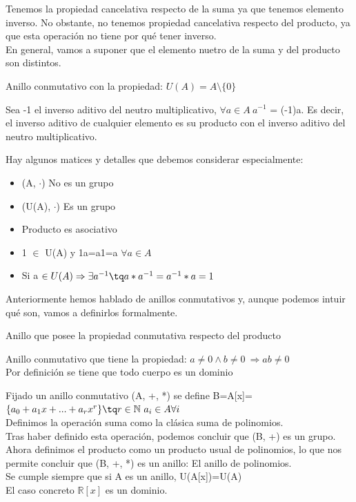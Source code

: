 \documentclass[nochap]{apuntes}
\begin{document}
Tenemos la propiedad cancelativa respecto de la suma ya que tenemos elemento inverso. No obstante, no tenemos propiedad cancelativa respecto del producto, 
ya que esta operación no tiene por qué tener inverso.\\
En general, vamos a suponer que el elemento nuetro de la suma y del producto son distintos.

\begin{defn}[Cuerpo]
 Anillo conmutativo con la propiedad: $U(A)=A \setminus \{0\}$
\end{defn}
\obs Sea -1 el inverso aditivo del neutro multiplicativo, $\forall a \in A \ a^{-1}$ = (-1)a. Es decir, el inverso aditivo de cualquier 
elemento es su producto con el inverso aditivo del neutro multiplicativo.

Hay algunos matices y detalles que debemos considerar especialmente:
\begin{itemize}
 \item (A, $\cdot$) No es un grupo
 \item (U(A), $\cdot$)  Es un grupo
 \item Producto es asociativo
 \item 1 $\in$ U(A) y 1a=a1=a $\forall a \in A$
 \item Si a $\in U(A) \Rightarrow \exists a^{-1} \tq a*a^{-1}=a^{-1}*a=1$
\end{itemize}

Anteriormente hemos hablado de anillos conmutativos y, aunque podemos intuir qué son, vamos a definirlos formalmente.
\begin{defn}
 Anillo que posee la propiedad conmutativa respecto del producto
\end{defn}

\begin{defn}[Dominio]
 Anillo conmutativo que tiene la propiedad: $a\neq 0 \wedge b\neq 0 \ \Rightarrow ab \neq 0$\\
 Por definición se tiene que todo cuerpo es un dominio
\end{defn}

\begin{example}
 Fijado un anillo conmutativo (A, +, *) se define B=A[x]=$\{a_0+a_1x+...+a_rx^{r}\} \tq r \in \mathbb{N} \ a_i \in A \forall i$\\
 Definimos la operación suma como la clásica suma de polinomios.\\
 Tras haber definido esta operación, podemos concluir que (B, +) es un grupo.\\
 Ahora definimos el producto como un producto usual de polinomios, lo que nos permite concluir que (B, +, *) es un anillo: El anillo
 de polinomios.\\
 Se cumple siempre que si A es un anillo, U(A[x])=U(A)\\
 El caso concreto $\mathbb{R}[x]$  es un dominio.
\end{example}
\end{document}
